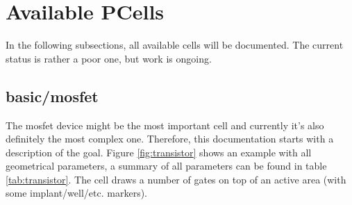 \section{Available PCells}
In the following subsections, all available cells will be documented. The current status is rather a poor one, but work is ongoing.

\subsection{basic/mosfet}
The mosfet device might be the most important cell and currently it's also definitely the most complex one.
Therefore, this documentation starts with a description of the goal.
Figure \ref{fig:transistor} shows an example with all geometrical parameters, a summary of all parameters can be found in table \ref{tab:transistor}.
The cell draws a number of gates on top of an active area (with some implant/well/etc. markers).
